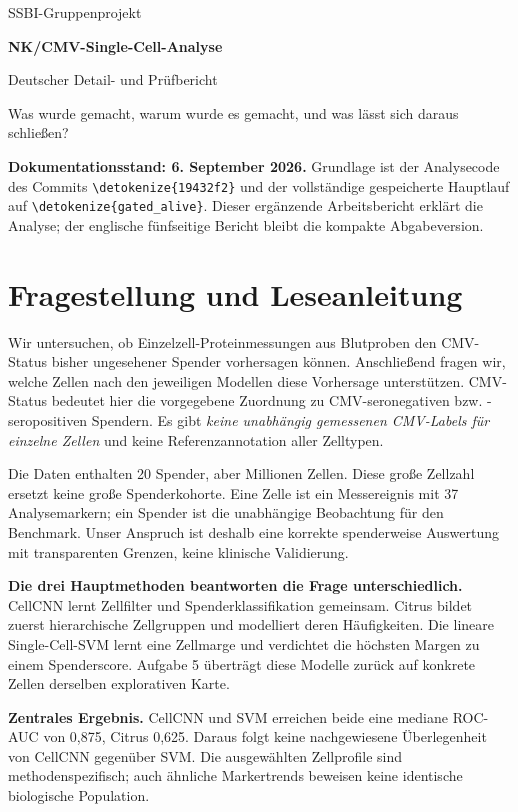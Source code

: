 \documentclass[11pt,a4paper]{article}
\newcommand{\code}[1]{\expandafter\nolinkurl\expandafter{\detokenize{#1}}}
\begin{document}
{\color{blue}\Large SSBI-Gruppenprojekt\par}
\vspace{7mm}
{\LARGE\bfseries NK/CMV-Single-Cell-Analyse\par}
\vspace{3mm}
{\Large Deutscher Detail- und Prüfbericht\par}
\vspace{4mm}
{\large Was wurde gemacht, warum wurde es gemacht, und was lässt sich daraus schließen?\par}
\vspace{7mm}
\textbf{Dokumentationsstand: 6. September 2026.} Grundlage ist der Analysecode des
Commits \code{19432f2} und der vollständige gespeicherte Hauptlauf auf
\code{gated_alive}. Dieser ergänzende Arbeitsbericht erklärt die Analyse;
der englische fünfseitige Bericht bleibt die kompakte Abgabeversion.

\section{Fragestellung und Leseanleitung}\label{sec:frage}
Wir untersuchen, ob Einzelzell-Proteinmessungen aus Blutproben den CMV-Status
bisher ungesehener Spender vorhersagen können. Anschließend fragen wir,
welche Zellen nach den jeweiligen Modellen diese Vorhersage unterstützen.
CMV-Status bedeutet hier die vorgegebene Zuordnung zu CMV-seronegativen bzw.
-seropositiven Spendern. Es gibt \emph{keine unabhängig gemessenen CMV-Labels
für einzelne Zellen} und keine Referenzannotation aller Zelltypen.

Die Daten enthalten 20 Spender, aber Millionen Zellen. Diese große Zellzahl
ersetzt keine große Spenderkohorte. Eine Zelle ist ein Messereignis mit 37
Analysemarkern; ein Spender ist die unabhängige Beobachtung für den Benchmark.
Unser Anspruch ist deshalb eine korrekte spenderweise Auswertung mit
transparenten Grenzen, keine klinische Validierung.

\textbf{Die drei Hauptmethoden beantworten die Frage unterschiedlich.}
CellCNN lernt Zellfilter und Spenderklassifikation gemeinsam. Citrus bildet
zuerst hierarchische Zellgruppen und modelliert deren Häufigkeiten. Die
lineare Single-Cell-SVM lernt eine Zellmarge und verdichtet die höchsten
Margen zu einem Spenderscore. Aufgabe 5 überträgt diese Modelle zurück auf
konkrete Zellen derselben explorativen Karte.

\textbf{Zentrales Ergebnis.} CellCNN und SVM erreichen beide eine mediane
ROC-AUC von 0,875, Citrus 0,625. Daraus folgt keine nachgewiesene Überlegenheit
von CellCNN gegenüber SVM. Die ausgewählten Zellprofile sind methodenspezifisch;
auch ähnliche Markertrends beweisen keine identische biologische Population.
\end{document}
